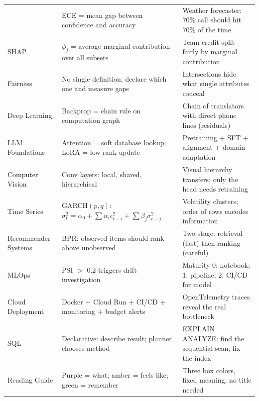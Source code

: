 \documentclass[12pt,a4paper]{article}
\begin{document}
\begin{center}
\begin{tabular}{@{}p{4.8cm} p{5.2cm} p{4.5cm}@{}}
  & ECE = mean gap between confidence and accuracy
  & Weather forecaster: 70\% call should hit 70\% of the time \\
\addlinespace
SHAP
  & $\phi_j$ = average marginal contribution over all subsets
  & Team credit split fairly by marginal contribution \\
\addlinespace
Fairness
  & No single definition; declare which one and measure gaps
  & Intersections hide what single attributes conceal \\
\addlinespace
Deep Learning
  & Backprop = chain rule on computation graph
  & Chain of translators with direct phone lines (residuals) \\
\addlinespace
LLM Foundations
  & Attention = soft database lookup; LoRA = low-rank update
  & Pretraining + SFT + alignment + domain adaptation \\
\addlinespace
Computer Vision
  & Conv layers: local, shared, hierarchical
  & Visual hierarchy transfers; only the head needs retraining \\
\addlinespace
Time Series
  & GARCH$(p,q)$: $\sigma^2_t=\alpha_0+\sum\alpha_i\epsilon^2_{t-i}+\sum\beta_j\sigma^2_{t-j}$
  & Volatility clusters; order of rows encodes information \\
\addlinespace
Recommender Systems
  & BPR: observed items should rank above unobserved
  & Two-stage: retrieval (fast) then ranking (careful) \\
\addlinespace
MLOps
  & PSI $>$ 0.2 triggers drift investigation
  & Maturity 0: notebook; 1: pipeline; 2: CI/CD for model \\
\addlinespace
Cloud Deployment
  & Docker + Cloud Run + CI/CD + monitoring + budget alerts
  & OpenTelemetry traces reveal the real bottleneck \\
\addlinespace
SQL
  & Declarative: describe result; planner chooses method
  & EXPLAIN ANALYZE: find the sequential scan, fix the index \\
\addlinespace
Reading Guide
  & Purple = what; amber = feels like; green = remember
  & Three box colors, fixed meaning, no title needed \\
\bottomrule
\end{tabular}
\end{center}
\end{document}
